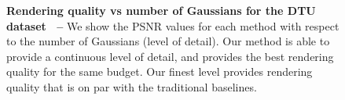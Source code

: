\begin{figure}[!t]
  \centering
  \vspace{-0.5em}
  \caption[Rendering quality under different number of Gaussians constraints]{\textbf{Rendering quality vs number of Gaussians for the DTU dataset~\cite{aanaes2016large} --}
    We show the PSNR values for each method with respect to the number of
    Gaussians (level of detail).
    Our method is able to provide a continuous level of detail, and provides the
    best rendering quality for the same budget.
    Our finest level provides rendering quality that is on par with the
    traditional baselines.
  }
  \label{fig:clog-num-gaussians-psnr}

\end{figure}